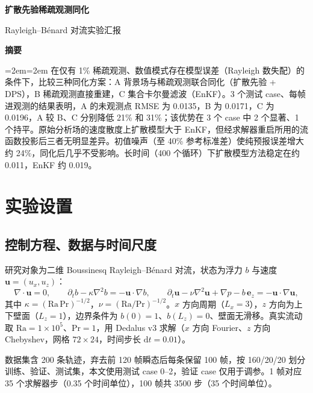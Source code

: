 \documentclass[10.5pt,a4paper]{article}
\begin{document}
\begin{center}
{\LARGE\bfseries 扩散先验稀疏观测同化\par}\vspace{.5em}
{\large Rayleigh--B\'enard 对流实验汇报\par}
\end{center}
\vspace{.3em}

\begin{center}\textbf{摘\quad 要}\end{center}
\begingroup\small\leftskip=2em\rightskip=2em
在仅有 1\% 稀疏观测、数值模式存在模型误差（Rayleigh 数失配）的条件下，比较三种同化方案：A 背景场与稀疏观测联合同化（扩散先验 + DPS），B 稀疏观测直接重建，C 集合卡尔曼滤波（EnKF）。3 个测试 case、每帧进观测的结果表明，A 的未观测点 RMSE 为 0.0135，B 为 0.0171，C 为 0.0196，A 较 B、C 分别降低 21\% 和 31\%；该优势在 3 个 case 中 2 个显著、1 个持平。原始分析场的速度散度上扩散模型大于 EnKF，但经求解器重启所用的流函数投影后三者无明显差异。初值噪声（至 40\% 参考标准差）使纯预报误差增大约 24\%，同化后几乎不受影响。长时间（400 个循环）下扩散模型方法稳定在约 0.011，EnKF 约 0.019。
\par\endgroup

\section{实验设置}
\subsection{控制方程、数据与时间尺度}
研究对象为二维 Boussinesq Rayleigh--B\'enard 对流，状态为浮力 $b$ 与速度 $\mathbf u=(u_x,u_z)$：
\begin{equation}
\nabla\!\cdot\!\mathbf u=0,\qquad \partial_t b-\kappa\nabla^2 b=-\mathbf u\!\cdot\!\nabla b,\qquad \partial_t\mathbf u-\nu\nabla^2\mathbf u+\nabla p-b\,\mathbf e_z=-\mathbf u\!\cdot\!\nabla\mathbf u,
\end{equation}
其中 $\kappa=(\mathrm{Ra}\,\mathrm{Pr})^{-1/2}$，$\nu=(\mathrm{Ra}/\mathrm{Pr})^{-1/2}$。$x$ 方向周期（$L_x=3$），$z$ 方向为上下壁面（$L_z=1$），边界条件为 $b(0)=1$、$b(L_z)=0$、壁面无滑移。真实流动取 $\mathrm{Ra}=1\times10^{5}$、$\mathrm{Pr}=1$，用 Dedalus v3 求解（$x$ 方向 Fourier、$z$ 方向 Chebyshev，网格 $72\times24$，时间步长 $\mathrm{d}t=0.01$）。

数据集含 200 条轨迹，弃去前 120 帧瞬态后每条保留 100 帧，按 160/20/20 划分训练、验证、测试集，本文使用测试 case 0--2，验证 case 仅用于调参。1 帧对应 35 个求解器步（0.35 个时间单位），100 帧共 3500 步（35 个时间单位）。
\end{document}
